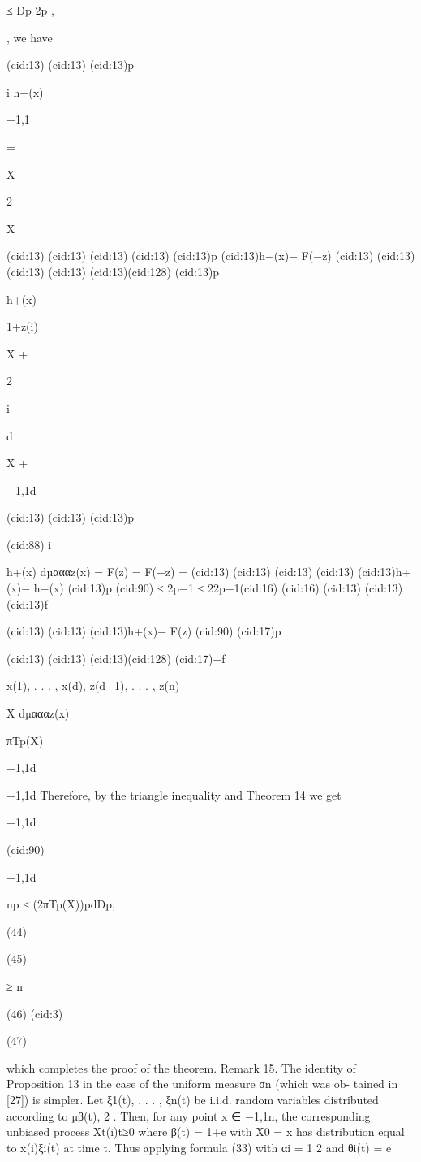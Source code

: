 {≤ Dp
2p ,

, we have

(cid:13)
(cid:13)
(cid:13)p

i h+(x)

{−1,1}

=

X

2

X

(cid:13)
(cid:13)
(cid:13)
(cid:13)
(cid:13)p
(cid:13)h−(x)− F(−z)
(cid:13)
(cid:13)
(cid:13)
(cid:13)
(cid:13)(cid:128)
(cid:13)p

h+(x)

1+z(i)

X +

2

i

d

X +

{−1,1}d

(cid:13)
(cid:13)
(cid:13)p

(cid:88) i

h+(x) dµαααz(x) = F(z) = F(−z) =
(cid:13)
(cid:13)
(cid:13)
(cid:13)
(cid:13)h+(x)− h−(x)
(cid:13)p
(cid:90)
≤ 2p−1
≤ 22p−1(cid:16)
(cid:16)
(cid:13)
(cid:13)
(cid:13)f

(cid:13)
(cid:13)
(cid:13)h+(x)− F(z)
(cid:90)
(cid:17)p

(cid:13)
(cid:13)
(cid:13)(cid:128)
(cid:17)−f

x(1), . . . , x(d), z(d+1), . . . , z(n)

X dµαααz(x)

πTp(X)

{−1,1}d

{−1,1}d
Therefore, by the triangle inequality and Theorem 14 we get

{−1,1}d

(cid:90)

{−1,1}d

np ≤ (2πTp(X))pdDp,

(44)

(45)

≥ n

(46)
(cid:3)

(47)

which completes the proof of the theorem.
Remark 15. The identity of Proposition 13 in the case of the uniform measure σn (which was ob-
tained in [27]) is simpler. Let ξ1(t), . . . , ξn(t) be i.i.d. random variables distributed according to µβ(t),
2 . Then, for any point x ∈ {−1,1}n, the corresponding unbiased process {Xt(i)}t≥0
where β(t) = 1+e
with X0 = x has distribution equal to x(i)ξi(t) at time t. Thus applying formula (33) with αi = 1
2
and θi(t) = e

}
